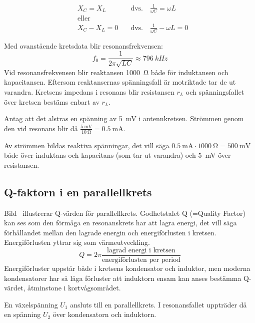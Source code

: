 \begin{align*}
& X_C = X_L \quad & \text{dvs.} \quad \frac{1}{\omega C} = \omega L\\
& \text{eller} & \\
& X_C - X_L = 0 \quad & \text{dvs.} \quad \frac{1}{\omega C} - \omega L = 0
\end{align*}

Med ovanstående kretsdata blir resonansfrekvensen:
%
\[
f_0 = \frac{1}{2\pi \sqrt{LC}} \approx 796\ kHz
\]
%
Vid resonansfrekvensen blir reaktansen \qty{1000}{\ohm} både för induktansen och
kapacitansen.
Eftersom reaktansernas spänningsfall är motriktade tar de ut varandra.
Kretsens impedans i resonans blir resistansen \(r_L\) och
spänningsfallet över kretsen bestäms enbart av \(r_L\).

Antag att det alstras en spänning av \qty{5}{\milli\volt} i antennkretsen.
Strömmen genom den vid resonans blir då
\(\frac{\qty{5}{\milli\volt}}{\qty{10}{\ohm}} = \qty{0,5}{\milli\ampere}\).

Av strömmen bildas reaktiva spänningar, det vill säga \(\qty{0,5}{\milli\ampere}
\cdot \qty{1000}{\ohm} = \qty{500}{\milli\volt}\) både över induktans och
kapacitans (som tar ut varandra) och \qty{5}{\milli\volt} över resistansen.

\subsection{Q-faktorn i en parallellkrets}
\label{Q-faktor}


Bild~ illustrerar Q-värden för parallellkrets.
Godhetstalet Q (=Quality Factor) kan ses som den förmåga en resonanskrets har
att lagra energi, det vill säga förhållandet mellan den lagrade energin och
energiförlusten i kretsen.
Energiförlusten yttrar sig som värmeutveckling.
%
\[
Q = 2\pi \frac{\text{lagrad energi i kretsen}}{\text{energiförlusten per period}}
\]
%
Energiförluster uppstår både i kretsens kondensator och induktor, men moderna
kondensatorer har så låga förluster att induktorn ensam kan anses bestämma
Q-värdet, åtminstone i kortvågsområdet.

En växelspänning \(U_1\) ansluts till en parallellkrets.
I resonansfallet uppträder då en spänning \(U_2\) över kondensatorn och
induktorn.

